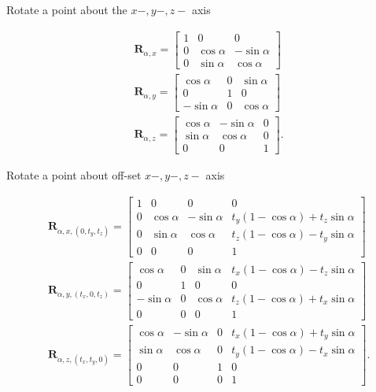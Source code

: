 \documentclass[10pt]{article}
\begin{document}
Rotate a point about the $x-, y-, z-$ axis

$$
\begin{aligned}
& \mathbf{R}_{\alpha, x}=\left[\begin{array}{ccc}
1 & 0 & 0 \\
0 & \cos \alpha & -\sin \alpha \\
0 & \sin \alpha & \cos \alpha
\end{array}\right] \\
& \mathbf{R}_{\alpha, y}=\left[\begin{array}{ccc}
\cos \alpha & 0 & \sin \alpha \\
0 & 1 & 0 \\
-\sin \alpha & 0 & \cos \alpha
\end{array}\right] \\
& \mathbf{R}_{\alpha, z}=\left[\begin{array}{ccc}
\cos \alpha & -\sin \alpha & 0 \\
\sin \alpha & \cos \alpha & 0 \\
0 & 0 & 1
\end{array}\right] .
\end{aligned}
$$

Rotate a point about off-set $x-, y-, z-$ axis

$$
\begin{aligned}
& \mathbf{R}_{\alpha, x,\left(0, t_{y}, t_{z}\right)}=\left[\begin{array}{cccc}
1 & 0 & 0 & 0 \\
0 & \cos \alpha & -\sin \alpha & t_{y}(1-\cos \alpha)+t_{z} \sin \alpha \\
0 & \sin \alpha & \cos \alpha & t_{z}(1-\cos \alpha)-t_{y} \sin \alpha \\
0 & 0 & 0 & 1
\end{array}\right] \\
& \mathbf{R}_{\alpha, y,\left(t_{x}, 0, t_{z}\right)}=\left[\begin{array}{cccc}
\cos \alpha & 0 & \sin \alpha & t_{x}(1-\cos \alpha)-t_{z} \sin \alpha \\
0 & 1 & 0 & 0 \\
-\sin \alpha & 0 & \cos \alpha & t_{z}(1-\cos \alpha)+t_{x} \sin \alpha \\
0 & 0 & 0 & 1
\end{array}\right] \\
& \mathbf{R}_{\alpha, z,\left(t_{x}, t_{y}, 0\right)}=\left[\begin{array}{cccc}
\cos \alpha & -\sin \alpha & 0 & t_{x}(1-\cos \alpha)+t_{y} \sin \alpha \\
\sin \alpha & \cos \alpha & 0 & t_{y}(1-\cos \alpha)-t_{x} \sin \alpha \\
0 & 0 & 1 & 0 \\
0 & 0 & 0 & 1
\end{array}\right] .
\end{aligned}
$$
\end{document}
